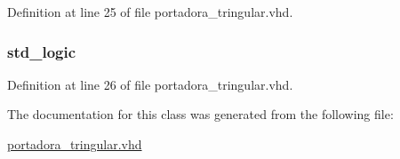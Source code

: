 Definition at line 25 of file portadora\+\_\+tringular.\+vhd.

\hypertarget{classportadora__tringular_1_1portadora__tringular_ae27566c74fe97a2b3c215e94dc35dd47}{}
\subsubsection[{dir\+\_\+int}]{ {\bfseries \textcolor{comment}{std\+\_\+logic}\textcolor{vhdlchar}{ }} \hspace{0.3cm}{\ttfamily [Signal]}}\label{classportadora__tringular_1_1portadora__tringular_ae27566c74fe97a2b3c215e94dc35dd47}


Definition at line 26 of file portadora\+\_\+tringular.\+vhd.



The documentation for this class was generated from the following file\+:\begin{DoxyCompactItemize}
\item 
\hyperlink{portadora__tringular_8vhd}{portadora\+\_\+tringular.\+vhd}\end{DoxyCompactItemize}
